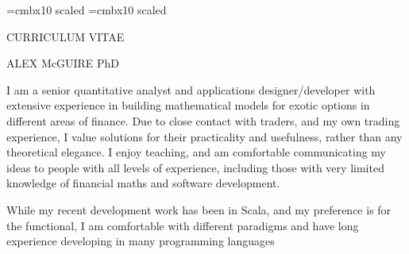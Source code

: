 \font\titlesize=cmbx10 scaled
\font\namesize=cmbx10 scaled
\vsize=10in
\hsize=8in
\voffset -0.4in
\hoffset -0.9in
\vskip 1cm

\centerline{\titlesize CURRICULUM VITAE}
\vskip 0.4in
\centerline{\namesize ALEX McGUIRE PhD}
\vskip 0.2in
\def\jobskip{\noalign{\bigskip}}
\def\posskip{\noalign{\medskip}}
\midinsert
\narrower\narrower\narrower
I am a senior quantitative analyst and applications designer/developer with extensive experience in building mathematical models for exotic options in 
different areas of finance. Due to close contact with traders, and my own trading experience, I value
solutions for their practicality and usefulness, rather than any theoretical elegance. I enjoy teaching, and am comfortable communicating my ideas to people with all
levels of experience, including those with very limited knowledge of financial maths and software development.

While my recent development work has been in Scala, and my preference is for the functional, 
I am comfortable with different paradigms and have long experience developing in many programming languages
\endinsert


